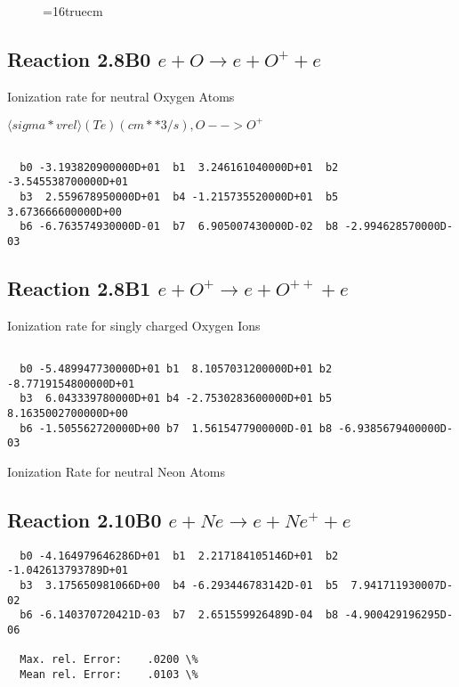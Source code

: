 \documentclass[12pt,dvipdfmx]{article}
\begin{document}
\begin{figure} \label{2.7B0}
\epsfxsize=16truecm
\end{figure}
\newpage

\subsection{
Reaction 2.8B0   $e + O \rightarrow e + O^+ + e  $
}

  Ionization rate for neutral Oxygen Atoms

  $ \langle sigma*vrel \rangle(Te)  (cm**3/s), O --> O^+$

\begin{small}\begin{verbatim}

  b0 -3.193820900000D+01  b1  3.246161040000D+01  b2 -3.545538700000D+01
  b3  2.559678950000D+01  b4 -1.215735520000D+01  b5  3.673666600000D+00
  b6 -6.763574930000D-01  b7  6.905007430000D-02  b8 -2.994628570000D-03

\end{verbatim}\end{small}
\subsection{
Reaction 2.8B1   $e + O^+ \rightarrow e + O^{++} + e  $
}

  Ionization rate for singly charged Oxygen Ions


\begin{small}\begin{verbatim}

  b0 -5.489947730000D+01 b1  8.1057031200000D+01 b2 -8.7719154800000D+01
  b3  6.043339780000D+01 b4 -2.7530283600000D+01 b5  8.1635002700000D+00
  b6 -1.505562720000D+00 b7  1.5615477900000D-01 b8 -6.9385679400000D-03

\end{verbatim}\end{small}

 Ionization Rate for neutral Neon Atoms

\subsection{
Reaction 2.10B0   $e + Ne \rightarrow e + Ne^+ + e  $
}

\begin{small}\begin{verbatim}
  b0 -4.164979646286D+01  b1  2.217184105146D+01  b2 -1.042613793789D+01
  b3  3.175650981066D+00  b4 -6.293446783142D-01  b5  7.941711930007D-02
  b6 -6.140370720421D-03  b7  2.651559926489D-04  b8 -4.900429196295D-06

  Max. rel. Error:    .0200 \%
  Mean rel. Error:    .0103 \%

\end{verbatim}\end{small}
\end{document}
